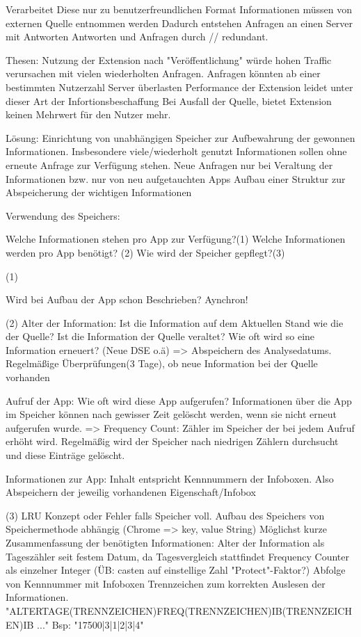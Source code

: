 Verarbeitet Diese nur zu benutzerfreundlichen Format
Informationen müssen von externen Quelle entnommen werden
Dadurch entstehen Anfragen an einen Server mit Antworten
Antworten und Anfragen durch // redundant.

Thesen:
Nutzung der Extension nach "Veröffentlichung" würde hohen Traffic verursachen mit vielen wiederholten Anfragen.
Anfragen könnten ab einer bestimmten Nutzerzahl Server überlasten
Performance der Extension leidet unter dieser Art der Infortionsbeschaffung
Bei Ausfall der Quelle, bietet Extension keinen Mehrwert für den Nutzer mehr.

Lösung:
Einrichtung von unabhängigen Speicher zur Aufbewahrung der gewonnen Informationen. Insbesondere viele/wiederholt genutzt Informationen sollen ohne erneute Anfrage zur Verfügung stehen.
Neue Anfragen nur bei Veraltung der Informationen bzw. nur von neu aufgetauchten Apps
Aufbau einer Struktur zur Abspeicherung der wichtigen Informationen


Verwendung des Speichers:

Welche Informationen stehen pro App zur Verfügung?(1)
Welche Informationen werden pro App benötigt? (2)
Wie wird der Speicher gepflegt?(3)

(1)

Wird bei Aufbau der App schon Beschrieben?
Aynchron!

(2)
Alter der Information:
Ist die Information auf dem Aktuellen Stand wie die der Quelle?
Ist die Information der Quelle veraltet?
Wie oft wird so eine Information erneuert? (Neue DSE o.ä)
=> Abspeichern des Analysedatums. Regelmäßige Überprüfungen(3 Tage), ob neue Information bei der Quelle vorhanden

Aufruf der App:
Wie oft wird diese App aufgerufen?
Informationen über die App im Speicher können nach gewisser Zeit gelöscht werden, wenn sie nicht erneut aufgerufen wurde.
=> Frequency Count: Zähler im Speicher der bei jedem Aufruf erhöht wird. Regelmäßig wird der Speicher nach niedrigen Zählern durchsucht und diese Einträge gelöscht.

Informationen zur App:
Inhalt entspricht Kennnummern der Infoboxen. Also Abspeichern der jeweilig vorhandenen Eigenschaft/Infobox

(3)
LRU Konzept oder Fehler falls Speicher voll.
Aufbau des Speichers von Speichermethode abhängig (Chrome => key, value String)
Möglichst kurze Zusammenfassung der benötigten Informationen:
Alter der Information als Tageszähler seit festem Datum, da Tagesvergleich stattfindet
Frequency Counter als einzelner Integer (ÜB: casten auf einstellige Zahl "Protect"-Faktor?)
Abfolge von Kennnummer mit Infoboxen
Trennzeichen zum korrekten Auslesen der Informationen.
"ALTERTAGE(TRENNZEICHEN)FREQ(TRENNZEICHEN)IB(TRENNZEICHEN)IB ..."
Bsp: "17500|3|1|2|3|4"

